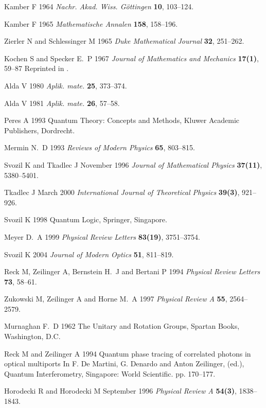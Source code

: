 \documentclass[12pt]{iopart}
\begin{document}
\begin{thebibliography}{10}
Kamber F 1964
{\em Nachr. Akad. Wiss. G{\"{o}}ttingen} {\bf 10}, 103--124.

Kamber F 1965
{\em Mathematische Annalen} {\bf 158}, 158--196.

Zierler N and Schlessinger M 1965
{\em Duke Mathematical Journal} {\bf 32}, 251--262.

Kochen S and Specker E.~P 1967
{\em Journal of Mathematics and Mechanics} {\bf 17(1)}, 59--87
Reprinted in \cite[pp. 235--263]{specker-ges}.

Alda V 1980
{\em Aplik. mate.} {\bf 25}, 373--374.

Alda V 1981
{\em Aplik. mate.} {\bf 26}, 57--58.

Peres A 1993
Quantum Theory: Concepts and Methods,
Kluwer Academic Publishers, Dordrecht.

Mermin N.~D 1993
{\em Reviews of Modern Physics} {\bf 65}, 803--815.

Svozil K and Tkadlec J November 1996
{\em Journal of Mathematical Physics} {\bf 37(11)}, 5380--5401.

Tkadlec J March 2000
{\em International Journal of Theoretical Physics} {\bf 39(3)}, 921--926.

Svozil K 1998
Quantum Logic,
Springer, Singapore.

Meyer D.~A 1999
{\em Physical Review Letters} {\bf 83(19)}, 3751--3754.

Svozil K 2004
{\em Journal of Modern Optics} {\bf 51}, 811--819.

Reck M, Zeilinger A, Bernstein H.~J  and Bertani P 1994
{\em Physical Review Letters} {\bf 73}, 58--61.

Zukowski M, Zeilinger A  and Horne M.~A 1997
{\em Physical Review A} {\bf 55}, 2564--2579.

Murnaghan F.~D 1962
The Unitary and Rotation Groups,
Spartan Books, Washington, D.C.

Reck M and Zeilinger A 1994
Quantum phase tracing of correlated photons in optical multiports
In F. De Martini, G. Denardo  and Anton Zeilinger, (ed.), Quantum
  Interferometry,  Singapore: World Scientific.
pp. 170--177.

Horodecki R and Horodecki M September 1996
{\em Physical Review A} {\bf 54(3)}, 1838--1843.


\end{thebibliography}
\end{document}
